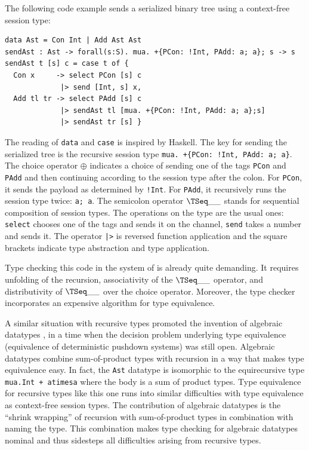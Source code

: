 The following code example \cite{DBLP:conf/icfp/ThiemannV16} sends a
serialized binary tree using a context-free session type:
\begin{lstlisting}
data Ast = Con Int | Add Ast Ast
sendAst : Ast -> forall(s:S). mua. +{PCon: !Int, PAdd: a; a}; s -> s
sendAst t [s] c = case t of {
  Con x     -> select PCon [s] c
             |> send [Int, s] x,
  Add tl tr -> select PAdd [s] c
             |> sendAst tl [mua. +{PCon: !Int, PAdd: a; a};s]
             |> sendAst tr [s] }
\end{lstlisting}
The reading of \lstinline+data+ and \lstinline+case+ is inspired by
Haskell. The key for sending the serialized tree is the recursive session type
\lstinline_mua. +{PCon: !Int, PAdd: a; a}_. The choice operator $\oplus$
indicates a choice of sending one of the tags \lstinline+PCon+ and
\lstinline+PAdd+ and then continuing according to the session type
after the colon. For \lstinline+PCon+,
it sends the payload as determined by \lstinline+!Int+. For \lstinline+PAdd+, it recursively runs the
session type twice: \lstinline+a; a+. The semicolon operator
$\TSeq\_\_$  stands for sequential composition of session types. The operations on the
type are the usual ones: \lstinline+select+ chooses one of the tags and
sends it on the channel, \lstinline+send+ takes a number and sends it.
The operator \lstinline+|>+ is reversed function application and the
square brackets indicate type abstraction and type application.

Type checking this code in the system of \citet{DBLP:conf/icfp/ThiemannV16} is
already quite demanding. It requires unfolding of the recursion,
associativity of the $\TSeq\_\_$ operator, and distributivity of
$\TSeq\_\_$ over the choice operator. Moreover, the type checker
incorporates an expensive algorithm for type equivalence. 

A similar situation with recursive types promoted the invention of algebraic datatypes
\cite{Burstall1977a,DBLP:conf/lfp/BurstallMS80}, in a time when the decision problem
underlying type equivalence (equivalence of deterministic pushdown systems) was still open.
Algebraic datatypes combine sum-of-product types with recursion in a
way that makes type equivalence easy. In fact, the \lstinline+Ast+
datatype is isomorphic to the equirecursive type
\lstinline_mua.Int + atimesa_ where the body is a sum of product
types. Type equivalence for recursive types like this one runs into
similar difficulties with type equivalence as context-free session
types. The contribution of algebraic datatypes is the ``shrink
wrapping'' of recursion with sum-of-product types in combination with
naming the type. This combination makes type checking for algebraic datatypes
nominal and thus sidesteps all difficulties arising from recursive
types. 

